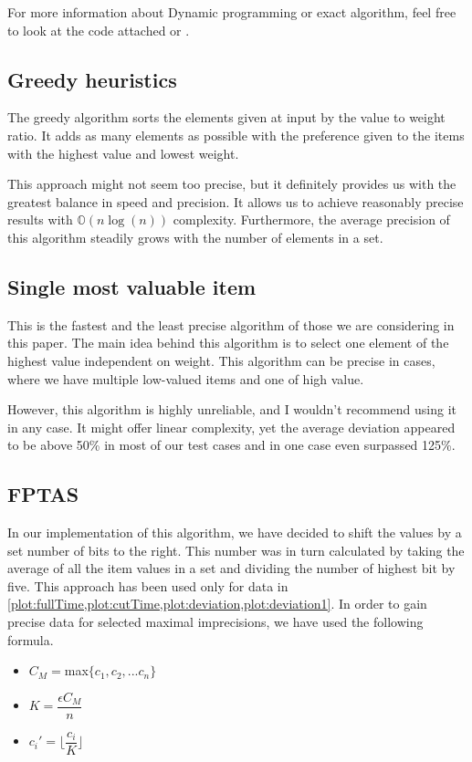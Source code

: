 For more information about Dynamic programming or exact algorithm, feel free to look at the code attached or \cite[Moodle textbook]{WEBSITE:dynamicKnapsack}.

\subsection{Greedy heuristics}
The greedy algorithm sorts the elements given at input by the value to weight ratio. It adds as many elements as possible with the preference given to the items with the highest value and lowest weight.

This approach might not seem too precise, but it definitely provides us with the greatest balance in speed and precision. It allows us to achieve reasonably precise results with $\mathbb{O}(n \log(n))$ complexity. Furthermore, the average precision of this algorithm steadily grows with the number of elements in a set.

\subsection{Single most valuable item}
This is the fastest and the least precise algorithm of those we are considering in this paper. The main idea behind this algorithm is to select one element of the highest value independent on weight. This algorithm can be precise in cases, where we have multiple low-valued items and one of high value.

However, this algorithm is highly unreliable, and I wouldn't recommend using it in any case. It might offer linear complexity, yet the average deviation appeared to be above 50\% in most of our test cases and in one case even surpassed 125\%.

\subsection{FPTAS}
In our implementation of this algorithm, we have decided to shift the values by a set number of bits to the right. This number was in turn calculated by taking the average of all the item values in a set and dividing the number of highest bit by five. This approach has been used only for data in \cref{plot:fullTime,plot:cutTime,plot:deviation,plot:deviation1}. In order to gain precise data for selected maximal imprecisions, we have used the following formula.

\begin{itemize}
    \item $C_M = $max$\{c_1,c_2, ... c_n\}$
    \item $K = \dfrac{\epsilon C_M}{n}$
    \item $c_i' = \lfloor\dfrac{c_i}{K}\rfloor$
\end{itemize}

